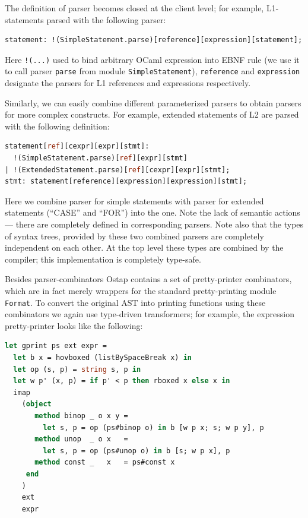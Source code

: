The definition of parser becomes closed at the client level; for example, L1-statements
parsed with the following parser:

\begin{lstlisting}[language=ocaml]
statement: !(SimpleStatement.parse)[reference][expression][statement];
\end{lstlisting}

Here \lstinline{!(...)} used to bind arbitrary OCaml expression into EBNF rule (we use it
to call parser \lstinline{parse} from module \lstinline{SimpleStatement}), \lstinline{reference} and
\lstinline{expression} designate the parsers for L1 references and expressions respectively.

Similarly, we can easily combine different parameterized parsers to obtain parsers for more
complex constructs. For example, extended statements of L2 are parsed with the following
definition:

\begin{lstlisting}[language=ocaml]
statement[ref][cexpr][expr][stmt]: 
  !(SimpleStatement.parse)[ref][expr][stmt]
| !(ExtendedStatement.parse)[ref][cexpr][expr][stmt];
stmt: statement[reference][expression][expression][stmt];
\end{lstlisting}

Here we combine parser for simple statements with parser for extended statements (``CASE'' and ``FOR'')
into the one. Note the lack of semantic actions --- there are completely defined in corresponding
parsers. Note also that the types of syntax trees, provided by these two combined parsers are completely 
independent on each other. At the top level these types are combined by the compiler; this implementation 
is completely type-safe.

Besides parser-combinators Ostap contains a set of pretty-printer combinators, which are
in fact merely wrappers for the standard pretty-printing module \lstinline{Format}. To
convert the original AST into printing functions using these combinators we again
use type-driven transformers; for example, the expression pretty-printer looks like
the following:

\begin{lstlisting}[language=ocaml]
let gprint ps ext expr =
  let b x = hovboxed (listBySpaceBreak x) in
  let op (s, p) = string s, p in
  let w p' (x, p) = if p' < p then rboxed x else x in 
  imap  
    (object 
       method binop _ o x y = 
         let s, p = op (ps#binop o) in b [w p x; s; w p y], p
       method unop  _ o x   = 
         let s, p = op (ps#unop o) in b [s; w p x], p
       method const _   x   = ps#const x
     end
    )
    ext
    expr
\end{lstlisting}

